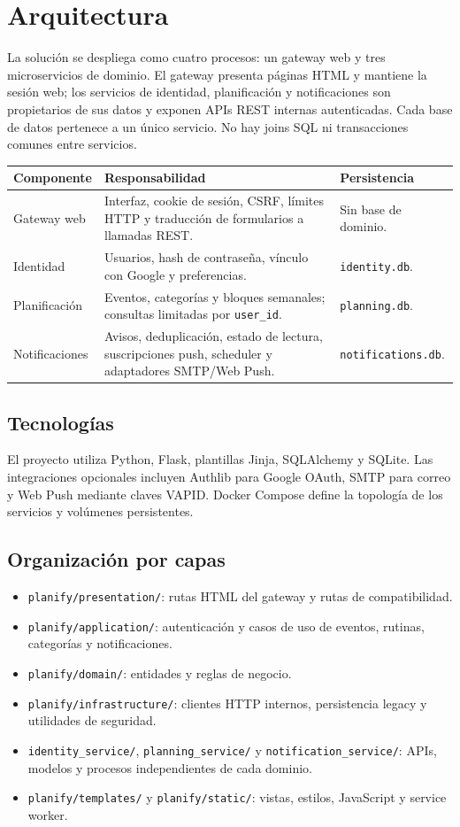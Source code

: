 \documentclass[12pt,a4paper]{article}
\begin{document}
\section{Arquitectura}
La solución se despliega como cuatro procesos: un gateway web y tres microservicios de dominio. El gateway presenta páginas HTML y mantiene la sesión web; los servicios de identidad, planificación y notificaciones son propietarios de sus datos y exponen APIs REST internas autenticadas. Cada base de datos pertenece a un único servicio. No hay joins SQL ni transacciones comunes entre servicios.

\begin{tabular}{|p{3.1cm}|p{7.3cm}|p{3.2cm}|}
\hline
\textbf{Componente} & \textbf{Responsabilidad} & \textbf{Persistencia} \\
\hline
Gateway web & Interfaz, cookie de sesión, CSRF, límites HTTP y traducción de formularios a llamadas REST. & Sin base de dominio. \\
\hline
Identidad & Usuarios, hash de contraseña, vínculo con Google y preferencias. & \texttt{identity.db}. \\
\hline
Planificación & Eventos, categorías y bloques semanales; consultas limitadas por \texttt{user\_id}. & \texttt{planning.db}. \\
\hline
Notificaciones & Avisos, deduplicación, estado de lectura, suscripciones push, scheduler y adaptadores SMTP/Web Push. & \texttt{notifications.db}. \\
\hline
\end{tabular}

\subsection{Tecnologías}
El proyecto utiliza Python, Flask, plantillas Jinja, SQLAlchemy y SQLite. Las integraciones opcionales incluyen Authlib para Google OAuth, SMTP para correo y Web Push mediante claves VAPID. Docker Compose define la topología de los servicios y volúmenes persistentes.

\subsection{Organización por capas}
\begin{itemize}
  \item \texttt{planify/presentation/}: rutas HTML del gateway y rutas de compatibilidad.
  \item \texttt{planify/application/}: autenticación y casos de uso de eventos, rutinas, categorías y notificaciones.
  \item \texttt{planify/domain/}: entidades y reglas de negocio.
  \item \texttt{planify/infrastructure/}: clientes HTTP internos, persistencia legacy y utilidades de seguridad.
  \item \texttt{identity\_service/}, \texttt{planning\_service/} y \texttt{notification\_service/}: APIs, modelos y procesos independientes de cada dominio.
  \item \texttt{planify/templates/} y \texttt{planify/static/}: vistas, estilos, JavaScript y service worker.
\end{itemize}
\end{document}
